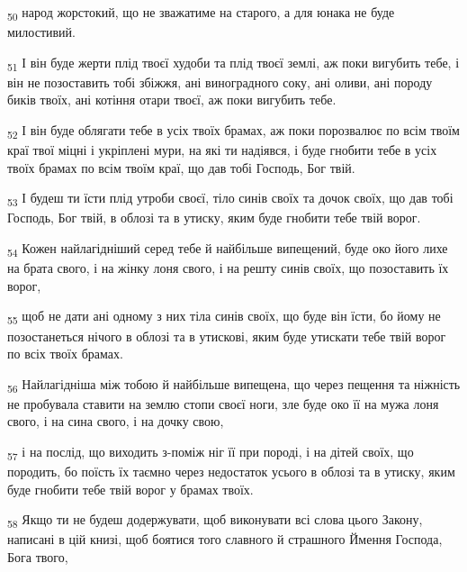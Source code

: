 \begin{tcolorbox}
\textsubscript{50} народ жорстокий, що не зважатиме на старого, а для юнака не буде милостивий.
\end{tcolorbox}
\begin{tcolorbox}
\textsubscript{51} І він буде жерти плід твоєї худоби та плід твоєї землі, аж поки вигубить тебе, і він не позоставить тобі збіжжя, ані виноградного соку, ані оливи, ані породу биків твоїх, ані котіння отари твоєї, аж поки вигубить тебе.
\end{tcolorbox}
\begin{tcolorbox}
\textsubscript{52} І він буде облягати тебе в усіх твоїх брамах, аж поки порозвалює по всім твоїм краї твої міцні і укріплені мури, на які ти надіявся, і буде гнобити тебе в усіх твоїх брамах по всім твоїм краї, що дав тобі Господь, Бог твій.
\end{tcolorbox}
\begin{tcolorbox}
\textsubscript{53} І будеш ти їсти плід утроби своєї, тіло синів своїх та дочок своїх, що дав тобі Господь, Бог твій, в облозі та в утиску, яким буде гнобити тебе твій ворог.
\end{tcolorbox}
\begin{tcolorbox}
\textsubscript{54} Кожен найлагідніший серед тебе й найбільше випещений, буде око його лихе на брата свого, і на жінку лоня свого, і на решту синів своїх, що позоставить їх ворог,
\end{tcolorbox}
\begin{tcolorbox}
\textsubscript{55} щоб не дати ані одному з них тіла синів своїх, що буде він їсти, бо йому не позостанеться нічого в облозі та в утискові, яким буде утискати тебе твій ворог по всіх твоїх брамах.
\end{tcolorbox}
\begin{tcolorbox}
\textsubscript{56} Найлагідніша між тобою й найбільше випещена, що через пещення та ніжність не пробувала ставити на землю стопи своєї ноги, зле буде око її на мужа лоня свого, і на сина свого, і на дочку свою,
\end{tcolorbox}
\begin{tcolorbox}
\textsubscript{57} і на послід, що виходить з-поміж ніг її при породі, і на дітей своїх, що породить, бо поїсть їх таємно через недостаток усього в облозі та в утиску, яким буде гнобити тебе твій ворог у брамах твоїх.
\end{tcolorbox}
\begin{tcolorbox}
\textsubscript{58} Якщо ти не будеш додержувати, щоб виконувати всі слова цього Закону, написані в цій книзі, щоб боятися того славного й страшного Ймення Господа, Бога твого,
\end{tcolorbox}

